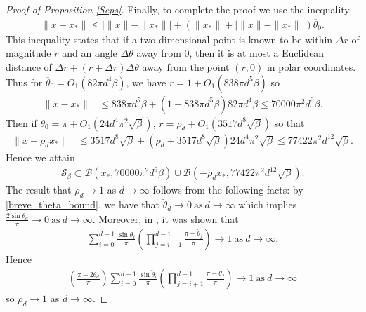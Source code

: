\documentclass[11pt]{article}
\newcommand{\Seps}{\mathcal{S}}
\theoremstyle{remark}
\begin{document}
\begin{proof}[Proof of Proposition \ref{Seps}]
Finally, to complete the proof we use the inequality \begin{align*}
\|x - x_*\| \leqslant |\|x\| - \|x_*\|| + \left(\|x_*\| + |\|x\| - \|x_*\||\right)\overline{\theta}_0.
\end{align*} This inequality states that if a two dimensional point is known to be within $\Delta r$ of magnitude $r$ and an angle $\Delta \theta$ away from $0$, then it is at most a Euclidean distance of $\Delta r + (r + \Delta r)\Delta \theta$ away from the point $(r,0)$ in polar coordinates. Thus for $\overline{\theta}_0 = O_1(82\pi d^4\beta)$, we have $r = 1 + O_1(838\pi d^5\beta)$ so \begin{align*}
    \|x-x_*\| & \leqslant 838\pi d^5\beta + (1 + 838\pi d^5\beta)82\pi d^4\beta \leqslant 70000\pi^2 d^9\beta.
\end{align*} Then if $\overline{\theta}_0 = \pi + O_1(24d^4 \pi^2 \sqrt{\beta})$, $r = \rho_d + O_1(3517d^8\sqrt{\beta})$ so that \begin{align*}
    \|x + \rho_d x_*\| &\leqslant 3517d^8\sqrt{\beta} + (\rho_d + 3517d^8\sqrt{\beta})24d^4\pi^2\sqrt{\beta}    %
     \leqslant 77422\pi^2d^{12}\sqrt{\beta}.
\end{align*} Hence we attain \begin{align*}
\Seps_{\beta} \subset \mathcal{B}(x_*,70000\pi^2 d^9\beta) \cup \mathcal{B}(-\rho_d x_*, 77422\pi^2d^{12}\sqrt{\beta}).
\end{align*} The result that $\rho_d \rightarrow 1$ as $d \rightarrow \infty$ follows from the following facts: by \eqref{breve_theta_bound}, we have that $\breve{\theta}_d \rightarrow 0\ \text{as}\ d \rightarrow \infty$ which implies $\frac{2\sin \breve{\theta}_d}{\pi} \rightarrow 0\ \text{as}\ d \rightarrow \infty.$ Moreover, in \cite{HV2017}, it was shown that \begin{align*}
\sum_{i=0}^{d-1}\frac{\sin \breve{\theta}_i}{\pi} \left(\prod_{j=i+1}^{d-1} \frac{\pi - \breve{\theta}_j}{\pi}\right) \rightarrow 1\ \text{as}\ d \rightarrow \infty.
\end{align*} Hence \begin{align*}\left(\frac{\pi - 2 \breve{\theta}_d}{\pi}\right) \sum_{i=0}^{d-1}\frac{\sin \breve{\theta}_i}{\pi} \left(\prod_{j=i+1}^{d-1} \frac{\pi - \breve{\theta}_j}{\pi}\right) \rightarrow 1\ \text{as}\ d \rightarrow \infty
\end{align*} so $\rho_d \rightarrow 1$ as $d \rightarrow \infty$.
\end{proof}
\end{document}
